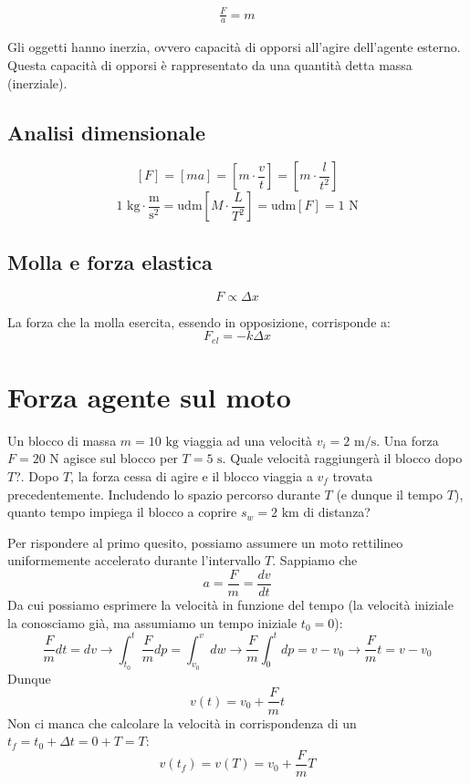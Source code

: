 \vspace{8pt}
\begin{tcolorbox}[colback = red!30, colframe = red!30!black, title = {Seconda legge della dinamica}]
    \begin{align}
        \frac{F}{a} = m
    \end{align}
\end{tcolorbox}
\vspace{5pt}

Gli oggetti hanno inerzia, ovvero capacità di opporsi all'agire dell'agente
esterno. Questa capacità di opporsi è rappresentato da una quantità detta
massa (inerziale).

\subsection{Analisi dimensionale}
\[ [F] = [ma] = \left[m\cdot\frac{v}{t}\right] = \left[m\cdot\frac{l}{t^2}\right]  \]
\[ 1\text{ kg}\cdot\frac{\text{m}}{\text{s}^2} = \text{udm}\left[M\cdot\frac{L}{T^2}\right] = \text{udm}[F] = 1\text{ N} \]


\subsection{Molla e forza elastica}
\[ F \propto \Delta x \]

La forza che la molla esercita, essendo in opposizione, corrisponde a:
\[ F_\textit{el} = -k\Delta x \]

\section{Forza agente sul moto}
Un blocco di massa $m = 10 \text{ kg}$ viaggia ad una velocità $v_i =
2 \text{ m/s}$. Una forza $F = 20 \text{ N}$ agisce sul blocco per
$T = 5 \text{ s}$. Quale velocità raggiungerà il blocco dopo $T$?.
Dopo $T$, la forza cessa di agire e il blocco viaggia a $v_f$ trovata
precedentemente. Includendo lo spazio percorso durante $T$ (e dunque il
tempo $T$), quanto tempo impiega il blocco a coprire $s_w = 2\text{ km}$
di distanza?

Per rispondere al primo quesito, possiamo assumere un moto rettilineo
uniformemente accelerato durante l'intervallo $T$. Sappiamo che \[ a = \frac{F}{m} = \frac{dv}{dt} \]
Da cui possiamo esprimere la velocità in funzione del tempo (la velocità
iniziale la conosciamo già, ma assumiamo un tempo iniziale $t_0 = 0$):
\[ \frac{F}{m}dt = dv \to \int_{t_0}^{t}\frac{F}{m}dp = \int_{v_0}^{v}dw \to \frac{F}{m}\int_{0}^{t}dp = v - v_0 \to \frac{F}{m}t = v - v_0 \]
Dunque
\[ v(t) = v_0 + \frac{F}{m}t \]
Non ci manca che calcolare la velocità in corrispondenza di un $t_f = t_0 + \Delta t = 0 + T = T$:
\[ v(t_f) = v(T) = v_0 + \frac{F}{m}T \]

